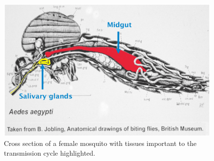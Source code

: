 
\begin{figure}[h]
\centering
\includegraphics[width=.6\linewidth]{figures/figs/mosqXsection.pdf}
\caption[Cross section of a female mosquito]{Cross section of a female mosquito with tissues important to the transmission cycle highlighted. \\  \CITEME}\label{fig:mosq-xsection}
\end{figure}